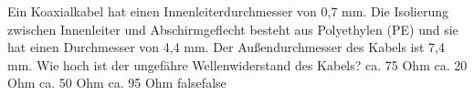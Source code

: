     {Ein Koaxialkabel hat einen Innenleiterdurchmesser von 0,7 mm. Die Isolierung zwischen Innenleiter und Abschirmgeflecht besteht aus Polyethylen (PE) und sie hat einen Durchmesser von 4,4 mm. Der Außendurchmesser des Kabels ist 7,4 mm. Wie hoch ist der ungefähre Wellenwiderstand des Kabels?}
    {ca. 75 Ohm}
    {ca. 20 Ohm}
    {ca. 50 Ohm}
    {ca. 95 Ohm}
    {false}{false}